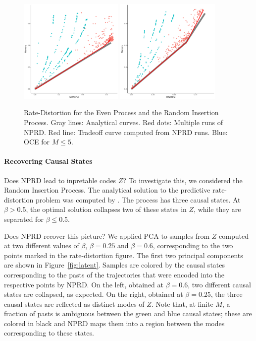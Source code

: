 \documentclass[11pt,letterpaper]{article}
\newif \ifcomment
\newcommand\rljf[1]{\ifcomment{{\color{blue}(#1)}}\else{}\fi}
\begin{document}
\begin{figure}
\includegraphics[width=0.45\textwidth]{code/figures/even-info.pdf}
\includegraphics[width=0.45\textwidth]{code/figures/rip-info.pdf}

	\caption{Rate-Distortion for the Even Process and the Random Insertion Process. Gray lines: Analytical curves. Red dots: Multiple runs of NPRD. Red line: Tradeoff curve computed from NPRD runs. Blue: OCE for $M\leq 5$. }\label{fig:even}
\end{figure}

\paragraph{Recovering Causal States}
Does NPRD lead to inpretable codes $Z$?
To investigate this, we considered the Random Insertion Process. The analytical solution to the predictive rate-distortion problem was computed by \cite{marzen-predictive-2016}.
The process has three causal states.
At $\beta > 0.5$, the optimal solution collapses two of these states in $Z$, while they are separated for $\beta \leq 0.5$.

\rljf{Describe the RIP}

Does NPRD recover this picture?
We applied PCA to samples from $Z$ computed at two different values of $\beta$, $\beta = 0.25$ and $\beta = 0.6$, corresponding to the two points marked in the rate-distortion figure.
The first two principal components are shown in Figure~\ref{fig:latent}.
Samples are colored by the causal states corresponding to the pasts of the trajectories that were encoded into the respective points by NPRD.
On the left, obtained at $\beta=0.6$, two different causal states are collapsed, as expected.
On the right, obtained at $\beta=0.25$, the three causal states are reflected as distinct modes of $Z$.
Note that, at finite $M$, a fraction of pasts is ambiguous between the green and blue causal states; these are colored in black and NPRD maps them into a region between the modes corresponding to these states.
\end{document}
